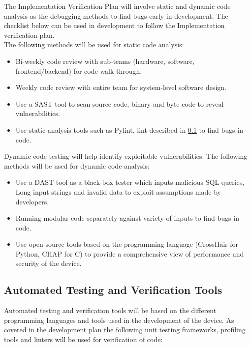 \documentclass[12pt, titlepage]{article}
\begin{document}
The Implementation Verification Plan will involve static and dynamic code analysis as the debugging methods to find bugs early in development. The checklist below can be used in development to follow the Implementation verification plan.\\
The following methods will be used for static code analysis:
\begin{itemize}
\item Bi-weekly code review with sub-teams (hardware, software, frontend/backend) for code walk through.
\item Weekly code review with entire team for system-level software design.
\item Use a SAST tool to scan source code, binary and byte code to reveal vulnerabilities.
\item Use static analysis tools such as Pylint, lint described in \ref{Automation} to find bugs in code.
\end{itemize}
Dynamic code testing will help identify exploitable vulnerabilities. The following methods will be used for dynamic code analysis:
\begin{itemize}
\item Use a DAST tool as a black-box tester which inputs malicious SQL queries, Long input strings and invalid data to exploit assumptions made by developers.
\item Running modular code separately against variety of inputs to find bugs in code.
\item Use open source tools based on the programming language (CrossHair for Python, CHAP for C) to provide a comprehensive view of performance and security of the device.
\end{itemize}


\subsection{Automated Testing and Verification Tools}\label{Automation}

Automated testing and verification tools will be based on the different programming languages and tools used in the development of the device. As covered in the development plan \cite{Development_Plan} the following unit testing frameworks, profiling tools and linters will be used for verification of code:
\end{document}
